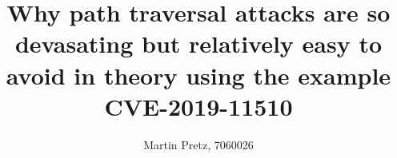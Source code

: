 \documentclass[a4paper,10pt,twocolumn]{article}
\begin{document}

\author{Martin Pretz, 7060026}
\title{\huge Why path traversal attacks are so devasating but relatively easy to avoid in theory 
\linebreak \linebreak 
\small using the example CVE-2019-11510}
\maketitle








\clearpage
\small
\onecolumn
\printbibliography
\end{document}
